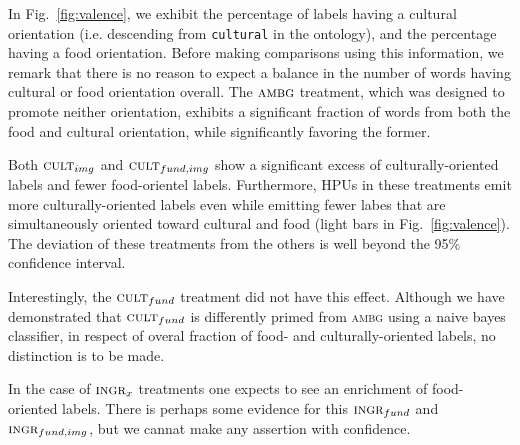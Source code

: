 \documentclass[letterpaper, 11pt, twocolumn]{article}
\begin{document}
In Fig.~\ref{fig:valence}, we exhibit the percentage of labels having a 
cultural orientation (i.e. descending from \texttt{cultural} in the ontology), and 
the percentage having a food orientation. Before making comparisons using this
information, we remark that there is no reason to expect a balance in the 
number of words having cultural or food orientation overall.  The $\textsc{ambg}$
treatment, which was designed to promote neither orientation, exhibits a
significant fraction of words from both the food and cultural orientation, while
significantly favoring the former.  

Both $\textsc{cult}_{img}$ and $\textsc{cult}_{fund,img}$ show a significant
excess of culturally-oriented labels and fewer food-orientel labels.  
Furthermore, HPUs in these treatments emit more culturally-oriented labels 
even while emitting fewer labes that are simultaneously oriented toward 
cultural and food (light bars in Fig.~\ref{fig:valence}).
The deviation of these treatments from
the others is well beyond the 95\% confidence interval.

Interestingly, the $\textsc{cult}_{fund}$ treatment did not have this effect.
Although we have demonstrated that $\textsc{cult}_{fund}$ is differently
primed from \textsc{ambg} using a naive bayes classifier, in respect of 
overal fraction of food- and culturally-oriented labels, no distinction 
is to be made.

In the case of $\textsc{ingr}_x$ treatments one expects to see an 
enrichment of food-oriented labels. There is perhaps some evidence for this
$\textsc{ingr}_{fund}$ and $\textsc{ingr}_{fund,img}$, but we cannat make any
assertion with confidence.
\end{document}
